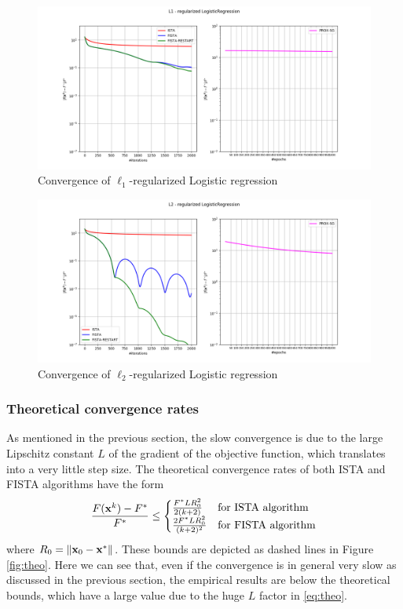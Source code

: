 \documentclass{article}
\begin{document}
\begin{figure}[ht]
    \centering
    \includegraphics[width=.9\textwidth]{img/convergence_l1.png}
    \caption{Convergence of $\ell_1$-regularized Logistic regression}
    \label{fig:conv_l1}
\end{figure}
\begin{figure}[ht]
    \centering
    \includegraphics[width=.9\textwidth]{img/convergence_l2.png}
    \caption{Convergence of $\ell_2$-regularized Logistic regression}
    \label{fig:conv_l2}
\end{figure}

\subsubsection*{Theoretical convergence rates}
As mentioned in the previous section, the slow convergence is due to the large Lipschitz constant $L$ of the gradient of the objective function, which translates into a very little step size. The theoretical convergence rates of both ISTA and FISTA algorithms have the form
\begin{align}
    \frac{F(\mathbf{x}^k) - F^*}{F^*} \leq 
    \begin{cases}
        \frac{F^* L R_0^2}{2(k+2)} &\text{for ISTA algorithm} \\
        \frac{2 F^* L R_0^2}{(k+2)^2} &\text{for FISTA algorithm}
    \end{cases}
    \label{eq:theo}
\end{align}
where $R_0 = \left\lVert\mathbf{x}_0 - \mathbf{x}^*\right\rVert$. These bounds are depicted as dashed lines in Figure \ref{fig:theo}. Here we can see that, even if the convergence is in general very slow as discussed in the previous section, the empirical results are below the theoretical bounds, which have a large value due to the huge $L$ factor in \eqref{eq:theo}.
\end{document}
